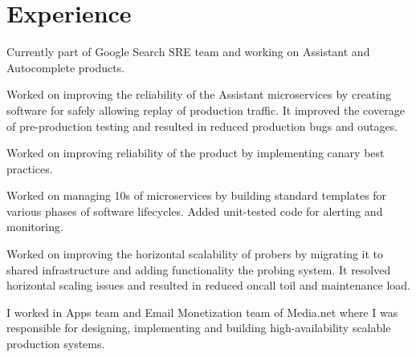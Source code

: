 \documentclass[]{deedy-resume-openfont}
\begin{document}
\begin{minipage}[t]{0.66\textwidth}


\section{Experience}


Currently part of Google Search SRE team and working on Assistant and Autocomplete products.

\textbullet{} Worked on improving the reliability of the Assistant microservices by creating software for safely allowing replay of production traffic. It improved the coverage of pre-production testing and resulted in reduced production bugs and outages.

\textbullet{} Worked on improving reliability of the product by implementing canary best practices.

\textbullet{} Worked on managing 10s of microservices by building standard templates for various phases of software lifecycles. Added unit-tested code for alerting and monitoring.

\textbullet{} Worked on improving the horizontal scalability of probers by migrating it to shared infrastructure and adding functionality the probing system. It resolved horizontal scaling issues and resulted in reduced oncall toil and maintenance load.

\sectionsep



I worked in Apps team and Email Monetization team of Media.net where I was responsible for designing, implementing and building high-availability scalable production systems.


\end{minipage}
\end{document}
